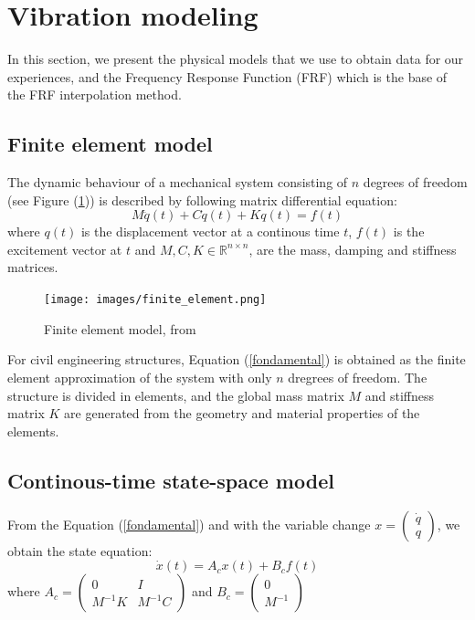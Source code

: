 \documentclass[journal]{IEEEtran}
\begin{document}
\section{Vibration modeling}

In this section, we present the physical models that we use to obtain data for our experiences, and the Frequency Response Function (FRF) which is the base of the FRF interpolation method. 

\subsection{Finite element model}

The dynamic behaviour of a mechanical system consisting of $n$ degrees of freedom (see Figure (\ref{finite_el})) is described by following matrix differential equation:
\begin{equation}
M \ddot{q}(t) + C \dot{q}(t) + K q(t) = f(t)
\label{fondamental}
\end{equation}
where $q(t)$ is the displacement vector at a continous time $t$, $f(t)$ is the excitement vector at $t$ and $M, C, K \in \mathbb{R}^{n \times n}$, are the mass, damping and stiffness matrices. 


\begin{figure}[h!]
  \centering
  \texttt{[image: images/finite\_element.png]}
  \caption{Finite element model, from \cite{peeters2000system}}
  \label{finite_el}
\end{figure}

For civil engineering structures, Equation (\ref{fondamental}) is obtained as the finite element approximation of the system with only $n$ dregrees of freedom.
The structure is divided in elements, and the global mass matrix $M$ and stiffness matrix $K$ are generated from the geometry and material
properties of the elements.

\subsection{Continous-time state-space model} %

From the Equation (\ref{fondamental}) and with the variable change $x =
\begin{pmatrix}
\dot{q} \\
q
\end{pmatrix}$, we obtain the state equation:
\begin{equation}
\dot{x}(t) = A_cx(t) + B_cf(t)
\end{equation}
 where
$A_c =
\begin{pmatrix}
0 & I \\
M^{-1}K & M^{-1}C
\end{pmatrix}$
and
$B_c=
\begin{pmatrix}
0 \\
M^{-1}
\end{pmatrix}$
\end{document}
